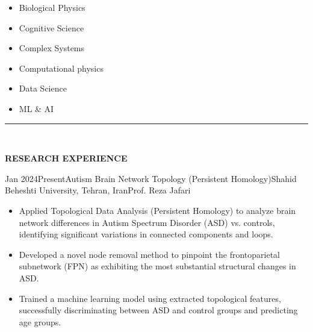 \documentclass[11pt, b4paper]{cv}
\begin{document}
\begin{multicols}{3}
	\begin{itemize}
		\setlength\itemsep{-1pt}
		\item Biological Physics
		\item Cognitive Science
		\item Complex Systems
		\item Computational physics
		\item Data Science
		\item ML \& AI
	\end{itemize}
\end{multicols}


\vspace{-0.15in}
\rule{\textwidth}{1pt}\\
\vspace{-0.15in}

\textbf{RESEARCH EXPERIENCE}\\
\vspace{-0.13in}

\begin{research_exp}{Jan 2024}{Present}{Autism Brain Network Topology (Persistent Homology)}{Shahid Beheshti University, Tehran, Iran}{Prof. Reza Jafari}
	 
\begin{itemize}
	\item Applied Topological Data Analysis (Persistent Homology) to analyze brain network differences in Autism Spectrum Disorder (ASD) vs. controls, identifying significant variations in connected components and loops.
	\item Developed a novel node removal method to pinpoint the frontoparietal subnetwork (FPN) as exhibiting the most substantial structural changes in ASD.
	\item Trained a machine learning model using extracted topological features, successfully discriminating between ASD and control groups and predicting age groups.
\end{itemize}
\end{research_exp}
\vspace{-0.1in}
\end{document}
